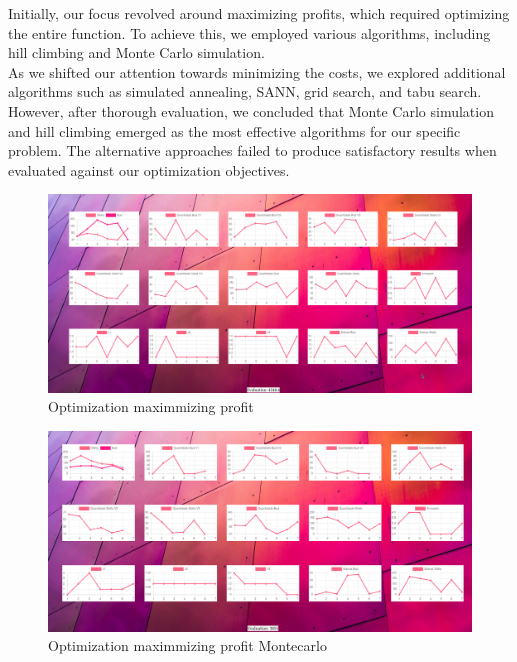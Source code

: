 Initially, our focus revolved around maximizing profits, which required optimizing the entire function. To achieve this, we employed various algorithms, including hill climbing and Monte Carlo simulation.\\


As we shifted our attention towards minimizing the costs, we explored additional algorithms such as simulated annealing, SANN, grid search, and tabu search. However, after thorough evaluation, we concluded that Monte Carlo simulation and hill climbing emerged as the most effective algorithms for our specific problem. The alternative approaches failed to produce satisfactory results when evaluated against our optimization objectives.\\


\begin{figure}[H]
    \centering
    \includegraphics[width=1\textwidth]{assets/opt4.jpeg}
    \caption{Optimization maximmizing profit}
    \label{fig:stella_outliers}
    \end{figure}

\begin{figure}[H]
    \centering
    \includegraphics[width=1\textwidth]{assets/opt1.jpeg}
    \caption{Optimization maximmizing profit Montecarlo}
    \label{fig:stella_outliers}
    \end{figure}


